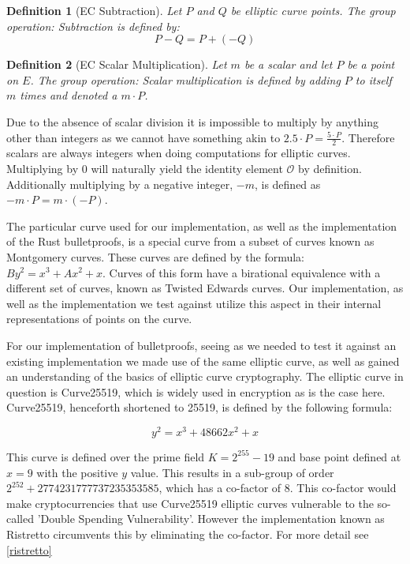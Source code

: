\documentclass{article}
\newtheorem{definition}{Definition}[section]
\begin{document}
\begin{definition}[EC Subtraction]
	Let $P$ and $Q$ be elliptic curve points. The group operation:
	Subtraction is defined by:
	$$P-Q = P + (-Q)$$
\end{definition}

\begin{definition}[EC Scalar Multiplication]
	Let $m$ be a scalar and let $P$ be a point on $E$. The group operation:
	Scalar multiplication is defined by adding $P$ to itself $m$ times and
	denoted a $m\cdot P$.
\end{definition}

Due to the absence of scalar division it is impossible to
multiply by anything other than integers as we cannot have something akin to $2.5 \cdot P = \frac{5\cdot P}{2}$. Therefore scalars are always integers when doing computations for elliptic curves. Multiplying by $0$ will
naturally yield the identity element $\mathcal{O}$ by definition.
Additionally multiplying by a negative integer, ${-m}$, is defined as
$-m\cdot P = m\cdot ({-P})$. 

The particular curve used for our implementation, as well as the
implementation of the Rust bulletproofs, is a special curve from a subset
of curves known as Montgomery curves. These curves are defined by the
formula: $By^2 = x^3 + Ax^2 + x$. Curves of this form have a birational
equivalence with a different set of curves, known as Twisted Edwards
curves. Our implementation, as well as the implementation we test against
utilize this aspect in their internal representations of points on the
curve.

For our implementation of bulletproofs, seeing as we needed to test it
against an existing implementation we made use of the same elliptic
curve, as well as gained an understanding of the basics of elliptic
curve cryptography. The elliptic curve in question is Curve25519, which
is widely used in encryption as is the case here. Curve25519, henceforth
shortened to 25519, is defined by the following formula:

$$y^2 = x^3 + 48662x^2 + x$$

This curve is defined over the prime field $K = 2^{255} - 19$ and base
point defined at $x = 9$ with the positive $y$ value. This results in a
sub-group of order $2^{252} + 2774231777737235353585$, which has a
co-factor of $8$. This co-factor would make cryptocurrencies that use
Curve25519 elliptic curves vulnerable to the so-called 'Double Spending
Vulnerability'. However the implementation known as Ristretto circumvents
this by eliminating the co-factor. For more detail see \ref{ristretto}
\end{document}
